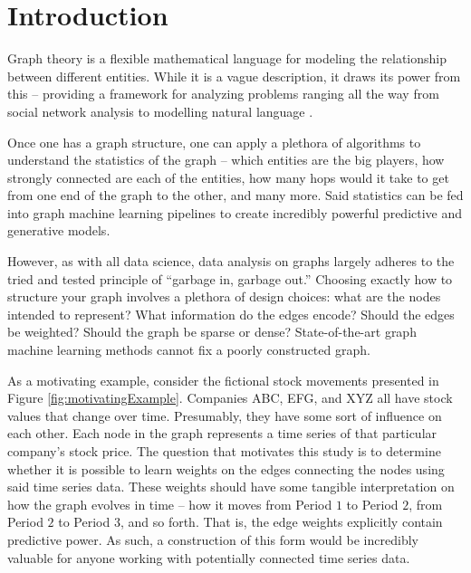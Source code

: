 \documentclass[12pt]{article}
\theoremstyle{definition}
\begin{document}
\section{Introduction}
\label{sec:intro}


Graph theory is a flexible mathematical language for modeling the relationship between different entities. While it is a vague description, it draws its power from this -- providing a framework for analyzing problems ranging all the way from social network analysis \cite{socialNetworkAnalysis} to modelling natural language \cite{speer2018conceptnet}. 

Once one has a graph structure, one can apply a plethora of algorithms to understand the statistics of the graph -- which entities are the big players, how strongly connected are each of the entities, how many hops would it take to get from one end of the graph to the other, and many more. Said statistics can be fed into graph machine learning pipelines to create incredibly powerful predictive and generative models.

However, as with all data science, data analysis on graphs largely adheres to the tried and tested principle of ``garbage in, garbage out.'' Choosing exactly how to structure your graph involves a plethora of design choices: what are the nodes intended to represent? What information do the edges encode? Should the edges be weighted? Should the graph be sparse or dense? State-of-the-art graph machine learning methods cannot fix a poorly constructed graph. 


As a motivating example, consider the fictional stock movements presented in Figure \ref{fig:motivatingExample}. Companies ABC, EFG, and XYZ all have stock values that change over time. Presumably, they have some sort of influence on each other. Each node in the graph represents a time series of that particular company's stock price. The question that motivates this  study is to determine whether it is possible to learn weights on the edges connecting the nodes using said time series data. These weights should have some tangible interpretation on how the graph evolves in time -- how it moves from Period $1$ to Period $2$, from Period $2$ to Period $3$, and so forth. That is, the edge weights explicitly contain predictive power. As such, a construction of this form would be incredibly valuable for anyone working with potentially connected time series data.
\end{document}
